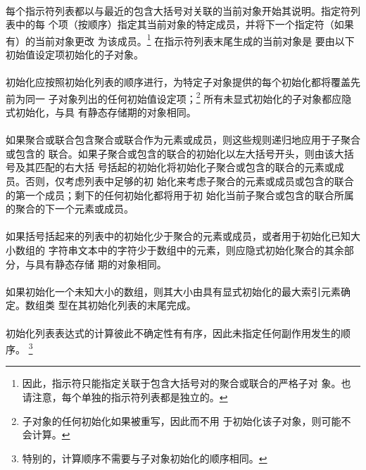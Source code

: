 {\paragraph{}
每个指示符列表都以与最近的包含大括号对关联的当前对象开始其说明。指定符列表中的每
个项（按顺序）指定其当前对象的特定成员，并将下一个指定符（如果有）的当前对象更改
为该成员。\footnote{因此，指示符只能指定关联于包含大括号对的聚合或联合的严格子对
象。也请注意，每个单独的指示符列表都是独立的。} 在指示符列表末尾生成的当前对象是
要由以下初始值设定项初始化的子对象。

\paragraph{}
初始化应按照初始化列表的顺序进行，为特定子对象提供的每个初始化都将覆盖先前为同一
子对象列出的任何初始值设定项；\footnote{子对象的任何初始化如果被重写，因此而不用
于初始化该子对象，则可能不会计算。} 所有未显式初始化的子对象都应隐式初始化，与具
有静态存储期的对象相同。

\paragraph{}
如果聚合或联合包含聚合或联合作为元素或成员，则这些规则递归地应用于子聚合或包含的
联合。如果子聚合或包含的联合的初始化以左大括号开头，则由该大括号及其匹配的右大括
号括起的初始化将初始化子聚合或包含的联合的元素或成员。否则，仅考虑列表中足够的初
始化来考虑子聚合的元素或成员或包含的联合的第一个成员；剩下的任何初始化都将用于初
始化当前子聚合或包含的联合所属的聚合的下一个元素或成员。

\paragraph{}
如果括号括起来的列表中的初始化少于聚合的元素或成员，或者用于初始化已知大小数组的
字符串文本中的字符少于数组中的元素，则应隐式初始化聚合的其余部分，与具有静态存储
期的对象相同。

\paragraph{}
如果初始化一个未知大小的数组，则其大小由具有显式初始化的最大索引元素确定。数组类
型在其初始化列表的末尾完成。

\paragraph{}
初始化列表表达式的计算彼此不确定性有有序，因此未指定任何副作用发生的顺序。
\footnote{特别的，计算顺序不需要与子对象初始化的顺序相同。}

}
